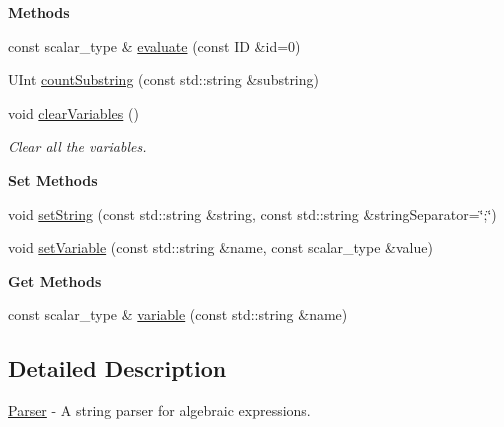 \begin{Indent}\textbf{ Methods}\par
\begin{DoxyCompactItemize}
\item 
const scalar\+\_\+type \& \hyperlink{classLifeV_1_1Parser_ac0e93cf8f4583c7c9f3c83990b4814a5}{evaluate} (const ID \&id=0)
\item 
U\+Int \hyperlink{classLifeV_1_1Parser_a37ae3af9abcf72ca8e1537ec771b523a}{count\+Substring} (const std\+::string \&substring)
\item 
\mbox{\label{classLifeV_1_1Parser_acbc44ff1f0b0074f071ea264a95cb9e7}} 
void \hyperlink{classLifeV_1_1Parser_acbc44ff1f0b0074f071ea264a95cb9e7}{clear\+Variables} ()
\begin{DoxyCompactList}\small\item\em Clear all the variables. \end{DoxyCompactList}\end{DoxyCompactItemize}
\end{Indent}
\begin{Indent}\textbf{ Set Methods}\par
\begin{DoxyCompactItemize}
\item 
void \hyperlink{classLifeV_1_1Parser_ac05769e836a0dc95d9c020df361a5194}{set\+String} (const std\+::string \&string, const std\+::string \&string\+Separator=\char`\"{};\char`\"{})
\item 
void \hyperlink{classLifeV_1_1Parser_a60ab2ac0a3a12770af9dc657ecbac38d}{set\+Variable} (const std\+::string \&name, const scalar\+\_\+type \&value)
\end{DoxyCompactItemize}
\end{Indent}
\begin{Indent}\textbf{ Get Methods}\par
\begin{DoxyCompactItemize}
\item 
const scalar\+\_\+type \& \hyperlink{classLifeV_1_1Parser_a2abb06796ab8b5968e824388b721427f}{variable} (const std\+::string \&name)
\end{DoxyCompactItemize}
\end{Indent}


\subsection{Detailed Description}
\hyperlink{classLifeV_1_1Parser}{Parser} -\/ A string parser for algebraic expressions. 

